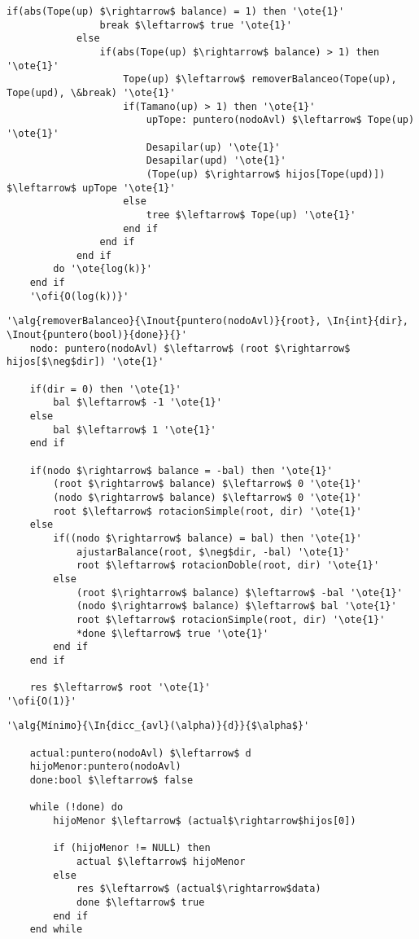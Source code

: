 \begin{lstlisting}[mathescape]
			if(abs(Tope(up) $\rightarrow$ balance) = 1) then '\ote{1}'
				break $\leftarrow$ true '\ote{1}'
			else
				if(abs(Tope(up) $\rightarrow$ balance) > 1) then '\ote{1}'
					Tope(up) $\leftarrow$ removerBalanceo(Tope(up), Tope(upd), \&break) '\ote{1}'
					if(Tamano(up) > 1) then '\ote{1}'
						upTope: puntero(nodoAvl) $\leftarrow$ Tope(up) '\ote{1}'
						Desapilar(up) '\ote{1}'
						Desapilar(upd) '\ote{1}'
						(Tope(up) $\rightarrow$ hijos[Tope(upd)]) $\leftarrow$ upTope '\ote{1}'
					else
						tree $\leftarrow$ Tope(up) '\ote{1}'
					end if
				end if
			end if
		do '\ote{log(k)}'
	end if
	'\ofi{O(log(k))}'
\end{lstlisting}

\begin{lstlisting}[mathescape]
'\alg{removerBalanceo}{\Inout{puntero(nodoAvl)}{root}, \In{int}{dir}, \Inout{puntero(bool)}{done}}{}'
	nodo: puntero(nodoAvl) $\leftarrow$ (root $\rightarrow$ hijos[$\neg$dir]) '\ote{1}'

	if(dir = 0) then '\ote{1}'
		bal $\leftarrow$ -1 '\ote{1}'
	else
		bal $\leftarrow$ 1 '\ote{1}'
	end if

	if(nodo $\rightarrow$ balance = -bal) then '\ote{1}'
		(root $\rightarrow$ balance) $\leftarrow$ 0 '\ote{1}'
		(nodo $\rightarrow$ balance) $\leftarrow$ 0 '\ote{1}'
		root $\leftarrow$ rotacionSimple(root, dir) '\ote{1}'
	else
		if((nodo $\rightarrow$ balance) = bal) then '\ote{1}'
			ajustarBalance(root, $\neg$dir, -bal) '\ote{1}'
			root $\leftarrow$ rotacionDoble(root, dir) '\ote{1}'
		else
			(root $\rightarrow$ balance) $\leftarrow$ -bal '\ote{1}'
			(nodo $\rightarrow$ balance) $\leftarrow$ bal '\ote{1}'
			root $\leftarrow$ rotacionSimple(root, dir) '\ote{1}'
			*done $\leftarrow$ true '\ote{1}'
		end if
	end if

	res $\leftarrow$ root '\ote{1}'
'\ofi{O(1)}'
\end{lstlisting}

\begin{lstlisting}[mathescape]
'\alg{Mínimo}{\In{dicc_{avl}(\alpha)}{d}}{$\alpha$}'

	actual:puntero(nodoAvl) $\leftarrow$ d
	hijoMenor:puntero(nodoAvl)
	done:bool $\leftarrow$ false

	while (!done) do
		hijoMenor $\leftarrow$ (actual$\rightarrow$hijos[0])

		if (hijoMenor != NULL) then
			actual $\leftarrow$ hijoMenor
		else
			res $\leftarrow$ (actual$\rightarrow$data)
			done $\leftarrow$ true
		end if
	end while
\end{lstlisting}

